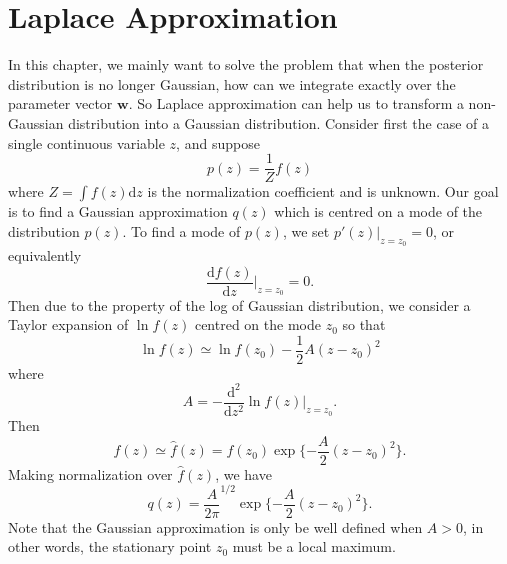 \documentclass[a4paper]{book}
\newcommand{\mrm}{\mathrm}
\newcommand{\mbf}{\mathbf}
\newcommand{\ud}{\mathrm{d}}
\newcommand{\md}{\mrm d}
\newcommand{\ww}{\mbf w}
\begin{document}
\section{Laplace Approximation}\label{Laplace Appro}
In this chapter, we mainly want to solve the problem that when the posterior distribution is no longer Gaussian, how can we integrate exactly over the parameter vector $\ww $. So Laplace approximation can help us to transform a non-Gaussian distribution  into a Gaussian distribution. Consider first the case of a single continuous variable $z$, and suppose
\begin{equation}\label{}
  p(z) = \frac{1}{Z}f(z)
\end{equation}
where $Z = \int f(z)\md z$ is the normalization coefficient and is unknown. Our goal is to find a Gaussian approximation $q(z)$ which is centred on a mode of the distribution $p(z)$. To find a mode of $p(z)$, we set $p'(z)|_{z=z_0} = 0$, or equivalently
\begin{equation}\label{}
  \frac{\ud f(z)}{\ud z}|_{z=z_0}=0.
\end{equation}
Then due to the property of the log of Gaussian distribution, we consider a Taylor expansion of $\ln f(z)$ centred on the mode $z_0$ so that
\begin{equation}\label{}
  \ln f(z)\simeq \ln f(z_0) - \frac{1}{2}A(z-z_0)^2
\end{equation}
where
\begin{equation}\label{}
  A = -\frac{\ud^2}{\ud z^2}\ln f(z)|_{z=z_0}.
\end{equation}
Then
\begin{equation}\label{}
  f(z) \simeq \hat f(z) = f(z_0)\exp\{-\frac A2(z-z_0)^2\}.
\end{equation}
Making normalization over $\hat f(z)$, we have
\begin{equation}\label{}
  q(z) = \frac{A}{2\pi}^{1/2}\exp\{-\frac A2(z-z_0)^2\}.
\end{equation}
Note that the Gaussian approximation is only be well defined when $A>0$, in other words, the stationary point $z_0$ must be a local maximum.
\end{document}
